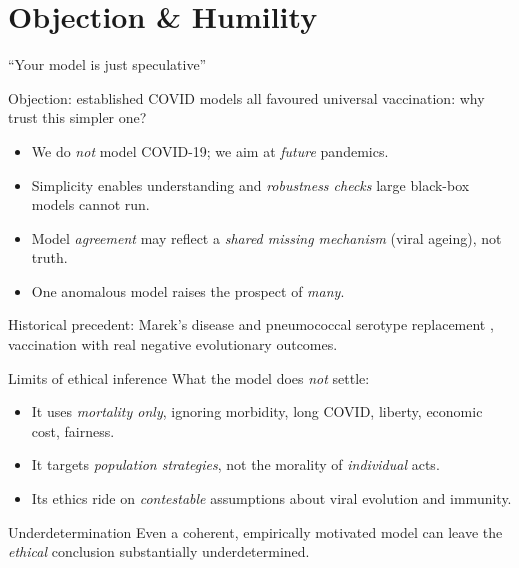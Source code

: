 \documentclass{if-beamer}
\begin{document}
\section{Objection \& Humility}
\begin{frame}{``Your model is just speculative''}
\justifying

Objection: established COVID models all favoured universal vaccination: why trust this simpler one?

\strut
\pause
\begin{itemize}
  \item We do \emph{not} model COVID-19; we aim at \emph{future} pandemics.
\pause
  \item Simplicity enables understanding and \emph{robustness checks} large black-box models cannot run.
\pause
  \item Model \emph{agreement} may reflect a \emph{shared missing mechanism} (viral ageing), not truth.
\pause
  \item One anomalous model raises the prospect of \emph{many}.
\end{itemize}

\strut
\pause

\small Historical precedent: Marek's disease \autocite{Read2015} and pneumococcal serotype replacement \autocite{Hanquet2022}, vaccination with real negative evolutionary outcomes.
\end{frame}

\begin{frame}{Limits of ethical inference}
\justifying
What the model does \emph{not} settle:

\strut

\begin{itemize}
  \item It uses \emph{mortality only}, ignoring morbidity, long COVID, liberty, economic cost, fairness.
\pause

\strut

  \item It targets \emph{population strategies}, not the morality of \emph{individual} acts.
\pause

\strut

  \item Its ethics ride on \emph{contestable} assumptions about viral evolution and immunity.
\end{itemize}

\strut
\pause
\begin{block}{Underdetermination}
Even a coherent, empirically motivated model can leave the \emph{ethical} conclusion substantially underdetermined.
\end{block}
\end{frame}
\end{document}
